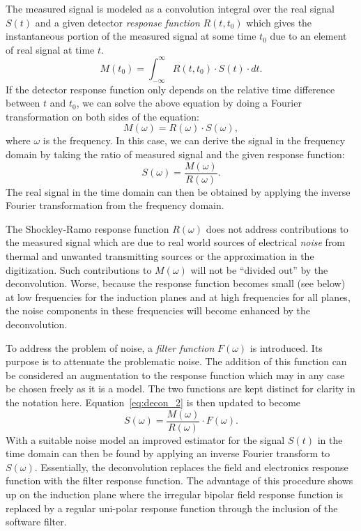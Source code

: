 The measured signal is
modeled as a convolution integral over the real signal $S(t)$ and a
given detector \textit{response function} $R(t,t_0)$ which gives the
instantaneous portion of the measured signal at some time $t_0$ due to
an element of real signal at time $t$.
\begin{equation}\label{eq:decon_1}
M(t_0) = \int_{-\infty}^{\infty}  R(t,t_0) \cdot S(t) \cdot dt.
\end{equation}
If the detector response function only depends on the relative time 
difference between $t$ and $t_0$, we can solve the above equation by 
doing a Fourier transformation on both sides of the equation:
\begin{equation}
M(\omega) = R(\omega) \cdot S(\omega), 
\end{equation}
where $\omega$ is the frequency. In this case, we can derive the signal in the 
frequency domain by taking the ratio of measured signal and the given
response function:
\begin{equation}\label{eq:decon_2}
S(\omega) = \frac{M(\omega)}{R(\omega)}.
\end{equation}
The real signal in the time domain can then be obtained by applying the 
inverse Fourier transformation from the frequency domain. 

The Shockley-Ramo response function $R(\omega)$ does not address
contributions to the measured signal which are due to real world
sources of electrical \textit{noise} from thermal and unwanted transmitting
sources or the approximation in the digitization.
Such contributions to $M(\omega)$ will not be ``divided out'' by the deconvolution.
Worse, because the response function becomes small (see below) at low 
frequencies for the induction planes and at high frequencies for all
planes, the noise components in these frequencies will become
enhanced by the deconvolution.

To address the problem of noise, a \textit{filter function} $F(\omega)$ is
introduced.  Its purpose is to attenuate the problematic noise.  The
addition of this function can be considered an augmentation to the
response function which may in any case be chosen freely as it is a model.  
The two functions are kept distinct for clarity in the notation here.
Equation~\ref{eq:decon_2} is then updated to become
\begin{equation}\label{eq:decon_filt}
S(\omega) = \frac{M(\omega)}{R(\omega)} \cdot F(\omega).
\end{equation}
With a suitable noise model an improved estimator for the signal
$S(t)$ in the time domain can then be found by applying an inverse Fourier 
transform to $S(\omega)$.  Essentially, the deconvolution replaces the field and 
electronics response function with the filter response function. The 
advantage of this procedure shows up on the induction plane where the irregular bipolar 
field response function is replaced by a regular uni-polar response function through
the inclusion of the software filter. 


